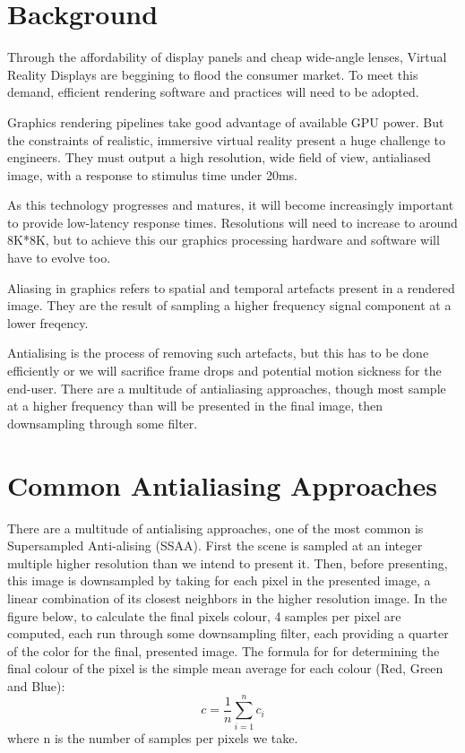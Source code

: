 \documentclass[12pt,a4paper,twoside,openright]{report}
\begin{document}
\section{Background}

Through the affordability of display panels and cheap wide-angle lenses, Virtual Reality Displays are beggining to flood the consumer market. To meet this demand, efficient rendering software and practices will need to be adopted.

Graphics rendering pipelines take good advantage of available GPU power. But the constraints of realistic, immersive virtual reality present a huge challenge to engineers. They must output a high resolution, wide field of view, antialiased image, with a response to stimulus time under 20ms.

As this technology progresses and matures, it will become increasingly important to provide low-latency response times. Resolutions will need to increase to around 8K*8K, but to achieve this our graphics processing hardware and software will have to evolve too.

Aliasing in graphics refers to spatial and temporal artefacts present in a rendered image. They are the result of sampling a higher frequency signal component at a lower freqency.

Antialising is the process of removing such artefacts, but this has to be done efficiently or we will sacrifice frame drops and potential motion sickness for the end-user.
There are a multitude of antialiasing approaches, though most sample at a higher frequency than will be presented in the final image, then downsampling through some filter. 

\section{Common Antialiasing Approaches}\label{supersampling}

There are a multitude of antialising approaches, one of the most common is Supersampled Anti-alising (SSAA).
First the scene is sampled at an integer multiple higher resolution than we intend to present it.
Then, before presenting, this image is downsampled by taking for each pixel in the presented image, a linear combination of its closest neighbors in the higher resolution image. In the figure below, to calculate the final pixels colour, 4 samples per pixel are computed, each run through some downsampling filter, each providing a quarter of the color for the final, presented image. The formula for for determining the final colour of the pixel is the simple mean average for each colour (Red, Green and Blue):
$$ c = \frac{1}{n}\displaystyle\sum_{i=1}^n c_i $$ where n is the number of samples per pixels we take.
\end{document}
